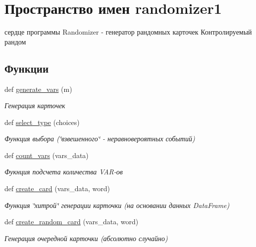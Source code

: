 \hypertarget{namespacerandomizer1}{}\section{Пространство имен randomizer1}
\label{namespacerandomizer1}


сердце программы Randomizer -\/ генератор рандомных карточек Контролируемый рандом  


\subsection*{Функции}
\begin{DoxyCompactItemize}
\item 
def \mbox{\hyperlink{namespacerandomizer1_a40bbd2b372ab50db7c35b965d9076355}{generate\+\_\+vars}} (m)
\begin{DoxyCompactList}\small\item\em Генерация карточек \end{DoxyCompactList}\item 
def \mbox{\hyperlink{namespacerandomizer1_a82d6d6bde9c9bf9b4624bda3d736dc5a}{select\+\_\+type}} (choices)
\begin{DoxyCompactList}\small\item\em Функция выбора (\char`\"{}взвешенного\char`\"{} -\/ неравновероятных событий) \end{DoxyCompactList}\item 
def \mbox{\hyperlink{namespacerandomizer1_a0d8fc6dae2c29e91762a929a62b58715}{count\+\_\+vars}} (vars\+\_\+data)
\begin{DoxyCompactList}\small\item\em Фукнция подсчета количества V\+A\+R-\/ов \end{DoxyCompactList}\item 
def \mbox{\hyperlink{namespacerandomizer1_a3983afcdf70cda27af08b896fe7988cb}{create\+\_\+card}} (vars\+\_\+data, word)
\begin{DoxyCompactList}\small\item\em Функция \char`\"{}хитрой\char`\"{} генерации карточки (на основании данных Data\+Frame) \end{DoxyCompactList}\item 
def \mbox{\hyperlink{namespacerandomizer1_a8acf66d6e60bed96fe8be151fd02fd57}{create\+\_\+random\+\_\+card}} (vars\+\_\+data, word)
\begin{DoxyCompactList}\small\item\em Генерация очередной карточки (абсолютно случайно) \end{DoxyCompactList}\item 

\end{DoxyCompactItemize}
